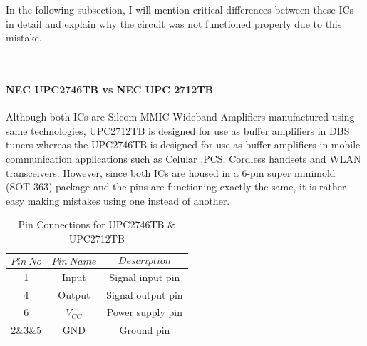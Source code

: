 	In the following subsection, I will mention critical differences between these ICs in detail and explain why the circuit was not functioned properly due to this mistake.

\-\\[2.5cm]

\paragraph{NEC UPC2746TB vs NEC UPC 2712TB}
\- \indent
	Although both ICs are Silcom MMIC Wideband Amplifiers manufactured using same technologies, UPC2712TB is designed for use as buffer amplifiers in DBS tuners\cite{2712} whereas the UPC2746TB is designed for use as buffer amplifiers in mobile communication applications such as Celular ,PCS, Cordless handsets and WLAN transceivers\cite{2746}. However, since both ICs are housed in a 6-pin super minimold (SOT-363) package and the pins are functioning exactly the same, it is rather easy making mistakes using one instead of another.
	
	
% 
%      

\begin{table}[H]
  \centering
 
    \begin{tabular}{c|c|c}
       $$Pin~No$$ & $$Pin~Name$$ & $$Description$$ \\ \hline
       1 & Input  & Signal input pin  \\ \hline
       4 & Output & Signal output pin  \\ \hline
       6 & $V_{CC}$ & Power supply pin  \\ \hline
       2\&3\&5 & GND & Ground pin
 	\end{tabular}
  \caption{Pin Connections for UPC2746TB \& UPC2712TB}
  \label{tab:pins}
\end{table}


